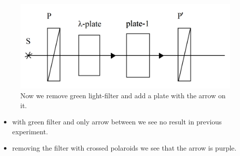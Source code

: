 \begin{minipage}{0.55\textwidth}
    \begin{figure}[h]
    \centering
    \includegraphics[width=1\textwidth]{images/arrow.png}
    \caption{Now we remove green light-filter and add a plate with the arrow on it.}
\end{figure}
\end{minipage}
\hfill
\begin{minipage}{0.35\textwidth}
    \begin{itemize}
    	\item with green filter and only arrow between we see no result in previous experiment.
    	\item removing the filter with crossed polaroids we see that the arrow is purple.
    \end{itemize}
\end{minipage}